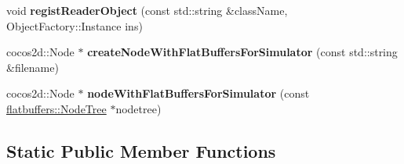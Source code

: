 \begin{DoxyCompactItemize}
void {\bfseries regist\+Reader\+Object} (const std\+::string \&class\+Name, Object\+Factory\+::\+Instance ins)
\item 
\mbox{\label{classCSLoader_a9b5bc1f45041a077822e6801699b4890}} 
cocos2d\+::\+Node $\ast$ {\bfseries create\+Node\+With\+Flat\+Buffers\+For\+Simulator} (const std\+::string \&filename)
\item 
\mbox{\label{classCSLoader_a08728f867d581fa8f6afef2f472b0d7e}} 
cocos2d\+::\+Node $\ast$ {\bfseries node\+With\+Flat\+Buffers\+For\+Simulator} (const \hyperlink{structflatbuffers_1_1NodeTree}{flatbuffers\+::\+Node\+Tree} $\ast$nodetree)
\end{DoxyCompactItemize}
\subsection*{Static Public Member Functions}
